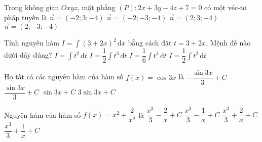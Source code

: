 \begin{ex}%
Trong không gian $O x y z$, mặt phẳng $(P): 2 x+3 y-4 z+7=0$ có một véc-tơ pháp tuyến là
\choice
{$\vec{n}=(-2 ; 3 ;-4)$}
{$\vec{n}=(-2 ;-3 ;-4)$}
{\True $\vec{n}=(2 ; 3 ;-4)$}
{$\vec{n}=(2 ;-3 ;-4)$}
\end{ex}

\begin{ex}%
Tính nguyên hàm $I=\displaystyle\int\limits (3+2x)^2\mathrm{\,d}x$ bằng cách đặt $t=3+2x$. Mệnh đề nào dưới đây đúng?
\choice
{$I=\displaystyle\int\limits t^2\mathrm{\,d}t$}
{$I=\dfrac{1}{2}\displaystyle\int\limits t^3\mathrm{\,d}t$}
{$I=\dfrac{1}{6}\displaystyle\int\limits t^3\mathrm{\,d}t$}
{\True $I=\dfrac{1}{2}\displaystyle\int\limits t^2\mathrm{\,d}t$}
\end{ex}

\begin{ex}%
Họ tất cả các nguyên hàm của hàm số $f(x)=\cos 3x$ là
\choice
{$-\dfrac{\sin 3x}{3}+C$}
{\True $\dfrac{\sin 3x}{3}+C$}
{$\sin 3x+C$}
{$3 \sin 3x+C$}
\end{ex}

\begin{ex}%
Nguyên hàm của hàm số $f(x)=x^2+\dfrac{2}{x^2}$ là
\choice
{\True $\dfrac{x^3}{3}-\dfrac{2}{x}+C$}
{$\dfrac{x^3}{3}-\dfrac{1}{x}+C$}
{$\dfrac{x^3}{3}+\dfrac{2}{x}+C$}
{$\dfrac{x^3}{3}+\dfrac{1}{x}+C$}
\end{ex}


